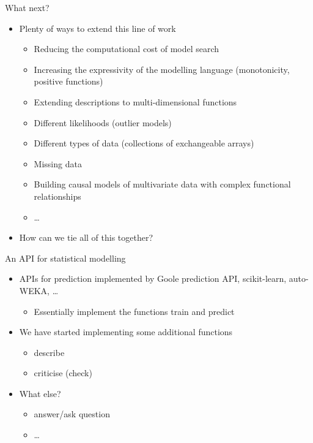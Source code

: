 \begin{frame}{What next?}
 \begin{itemize}
   \item Plenty of ways to extend this line of work \eg
   \begin{itemize}
     \item Reducing the computational cost of model search
     \item Increasing the expressivity of the modelling language (\eg monotonicity, positive functions)
     \item Extending descriptions to multi-dimensional functions
     \item Different likelihoods (\eg outlier models)
     \item Different types of data (\eg collections of exchangeable arrays)
     \item Missing data
     \item Building causal models of multivariate data with complex functional relationships
     \item \dots
   \end{itemize}
   \vspace{\baselineskip}
   \item How can we tie all of this together?
 \end{itemize}
\end{frame}

\begin{frame}{An API for statistical modelling}
  \begin{itemize}
    \item APIs for prediction implemented by \eg  Goole prediction API, scikit-learn, auto-WEKA, \dots
    \begin{itemize}
      \item Essentially implement the functions train and predict
    \end{itemize}
    \vspace{\baselineskip}
    \item We have started implementing some additional functions
    \begin{itemize}
      \item describe
      \item criticise (check)
    \end{itemize}
    \vspace{\baselineskip}
    \item What else?
    \begin{itemize}
      \item answer/ask question
      \item \dots
    \end{itemize}
  \end{itemize}
\end{frame}

